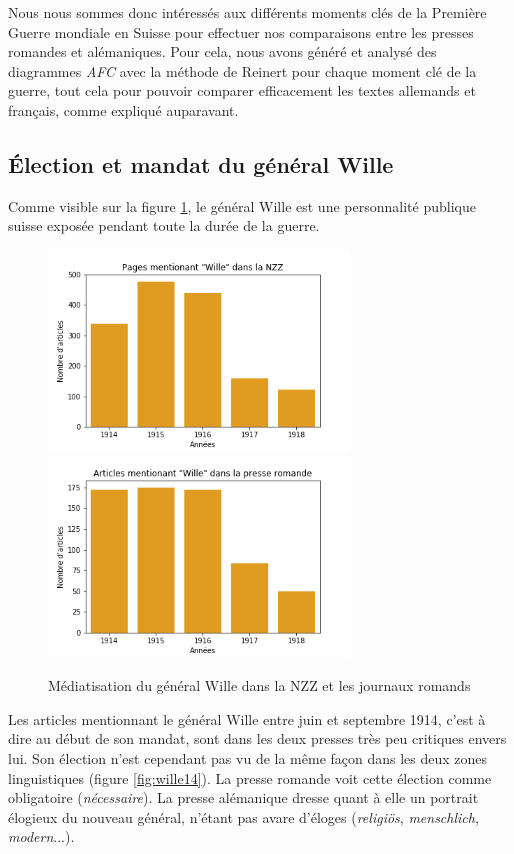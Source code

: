 \documentclass[french,a4paper]{article}
\begin{document}
Nous nous sommes donc intéressés aux différents moments clés de la Première Guerre mondiale en Suisse pour effectuer nos comparaisons entre les presses romandes et alémaniques.
Pour cela, nous avons généré et analysé des diagrammes \textit{AFC} avec la méthode de Reinert pour chaque moment clé de la guerre, tout cela pour pouvoir comparer efficacement les textes allemands et français, comme expliqué auparavant.

\subsection*{Élection et mandat du général Wille}

Comme visible sur la figure \ref{fig:wille}, le général Wille est une personnalité publique suisse exposée pendant toute la durée de la guerre.

\begin{figure}[h]
    \includegraphics[width=8cm]{imgs/Wille_NZZ.png}
    \includegraphics[width=8cm]{imgs/Wille_romands.png}
    \caption{Médiatisation du général Wille dans la NZZ et les journaux romands}
    \centering
    \label{fig:wille}
\end{figure}

Les articles mentionnant le général Wille entre juin et septembre 1914, c'est à dire au début de son mandat, sont dans les deux presses très peu critiques envers lui. 
Son élection n'est cependant pas vu de la même façon dans les deux zones linguistiques (figure \ref{fig:wille14}).
La presse romande voit cette élection comme obligatoire (\textit{nécessaire}). 
La presse alémanique dresse quant à elle un portrait élogieux du nouveau général, n'étant pas avare d'éloges (\textit{religiös}, \textit{menschlich}, \textit{modern}...).
\end{document}
